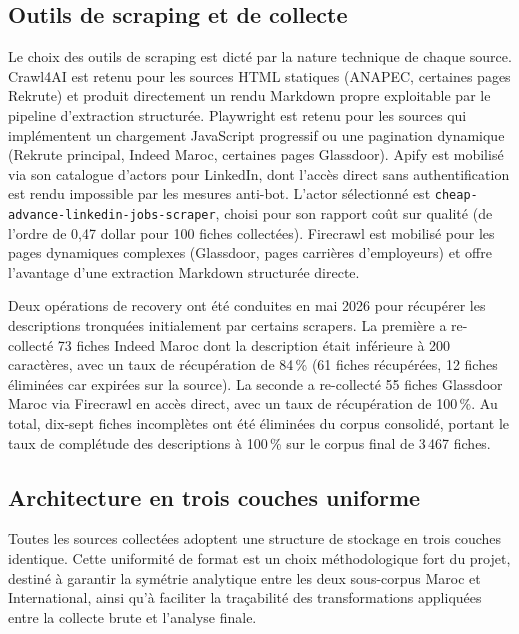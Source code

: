 \documentclass[11pt,a4paper,openany]{report}
\begin{document}
\subsection{Outils de scraping et de collecte}

Le choix des outils de scraping est dict\'e par la nature technique de chaque source. Crawl4AI est retenu pour les sources HTML statiques (ANAPEC, certaines pages Rekrute) et produit directement un rendu Markdown propre exploitable par le pipeline d'extraction structur\'ee. Playwright est retenu pour les sources qui impl\'ementent un chargement JavaScript progressif ou une pagination dynamique (Rekrute principal, Indeed Maroc, certaines pages Glassdoor). Apify est mobilis\'e via son catalogue d'actors pour LinkedIn, dont l'acc\`es direct sans authentification est rendu impossible par les mesures anti-bot. L'actor s\'electionn\'e est \texttt{cheap-advance-linkedin-jobs-scraper}, choisi pour son rapport co\^ut sur qualit\'e (de l'ordre de 0,47 dollar pour 100 fiches collect\'ees). Firecrawl est mobilis\'e pour les pages dynamiques complexes (Glassdoor, pages carri\`eres d'employeurs) et offre l'avantage d'une extraction Markdown structur\'ee directe.

Deux op\'erations de recovery ont \'et\'e conduites en mai 2026 pour r\'ecup\'erer les descriptions tronqu\'ees initialement par certains scrapers. La premi\`ere a re-collect\'e 73 fiches Indeed Maroc dont la description \'etait inf\'erieure \`a 200 caract\`eres, avec un taux de r\'ecup\'eration de 84\,\% (61 fiches r\'ecup\'er\'ees, 12 fiches \'elimin\'ees car expir\'ees sur la source). La seconde a re-collect\'e 55 fiches Glassdoor Maroc via Firecrawl en acc\`es direct, avec un taux de r\'ecup\'eration de 100\,\%. Au total, dix-sept fiches incompl\`etes ont \'et\'e \'elimin\'ees du corpus consolid\'e, portant le taux de compl\'etude des descriptions \`a 100\,\% sur le corpus final de 3\,467 fiches.

\subsection{Architecture en trois couches uniforme}

Toutes les sources collect\'ees adoptent une structure de stockage en trois couches identique. Cette uniformit\'e de format est un choix m\'ethodologique fort du projet, destin\'e \`a garantir la sym\'etrie analytique entre les deux sous-corpus Maroc et International, ainsi qu'\`a faciliter la tra\c{c}abilit\'e des transformations appliqu\'ees entre la collecte brute et l'analyse finale.
\end{document}
